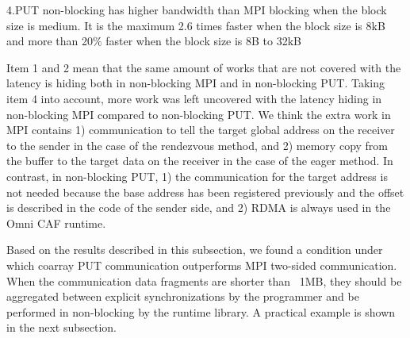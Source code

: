 4.PUT non-blocking has higher bandwidth than MPI blocking when the block size 
is medium. It is the maximum 2.6 times faster when the block size is 8kB and 
more than 20\% faster when the block size is 8B to 32kB

Item 1 and 2 mean that the same amount of works that are not covered with 
the latency is hiding both in non-blocking MPI and in non-blocking PUT. Taking 
item 4 into account, more work was left uncovered with the latency hiding 
in non-blocking MPI compared to non-blocking PUT. We think the extra work 
in MPI contains 1) communication to tell the target global address on the 
receiver to the sender in the case of the rendezvous method, and 2) memory 
copy from the buffer to the target data on the receiver in the case of the 
eager method. In contrast, in non-blocking PUT, 1) the communication for the 
target address is not needed because the base address has been registered 
previously and the offset is described in the code of the sender side, and 
2) RDMA is always used in the Omni CAF runtime. 

Based on the results described in this subsection, we found a condition under 
which coarray PUT communication outperforms MPI two-sided communication. When 
the communication data fragments are shorter than ~1MB, they should be aggregated 
between explicit synchronizations by the programmer and be performed in non-blocking 
by the runtime library. A practical example is shown in the next subsection.




